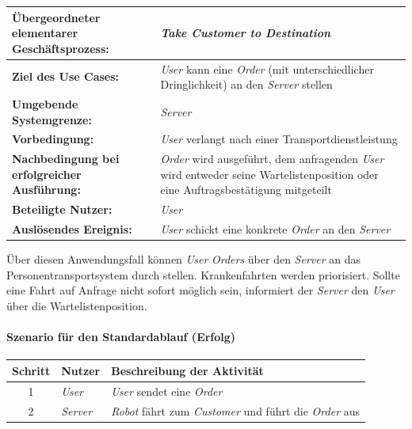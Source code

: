 			\begin{table}[H]
				\centering
				\begin{tabularx}{\textwidth}{|p{5cm}|X|}
					\hline
					\textbf{Übergeordneter elementarer Geschäftsprozess:} & \emph{Take Customer to Destination}  \\ \hline
					\textbf{Ziel des Use Cases:} & \emph{User} kann eine \emph{Order} (mit unterschiedlicher Dringlichkeit) an den \emph{Server} stellen \\ \hline
					\textbf{Umgebende Systemgrenze:} & \emph{Server} \\ \hline
					\textbf{Vorbedingung:} & \emph{User} verlangt nach einer Transportdienstleistung \\ \hline
					\textbf{Nachbedingung bei erfolgreicher Ausführung:} & \emph{Order} wird ausgeführt, dem anfragenden \emph{User} wird entweder seine Wartelistenposition oder eine Auftragsbestätigung mitgeteilt \\ \hline
					\textbf{Beteiligte Nutzer:} & \emph{User} \\ \hline
					\textbf{Auslösendes Ereignis:} & \emph{User} schickt eine konkrete \emph{Order} an den \emph{Server} \\
					\hline
				\end{tabularx}
			\end{table}
			
			Über diesen Anwendungsfall können \emph{User} \emph{Orders} über den \emph{Server} an das Personentransportsystem durch stellen.
			Krankenfahrten werden priorisiert. Sollte eine Fahrt auf Anfrage nicht sofort möglich sein, informiert der \emph{Server} den \emph{User} über die Wartelistenposition.
			
				\paragraph*{Szenario für den Standardablauf (Erfolg)}
	
				\begin{table}[H]
					\centering
					\begin{tabularx}{\textwidth}{|c|p{2cm}|X|}
					\hline
					Schritt & Nutzer & Beschreibung der Aktivität \\ \hline
					1 & \emph{User} & \emph{User} sendet eine \emph{Order} \\
					2 & \emph{Server} & \emph{Robot} fährt zum \emph{Customer} und führt die \emph{Order} aus  \\
					\hline
					\end{tabularx}
				\end{table}
